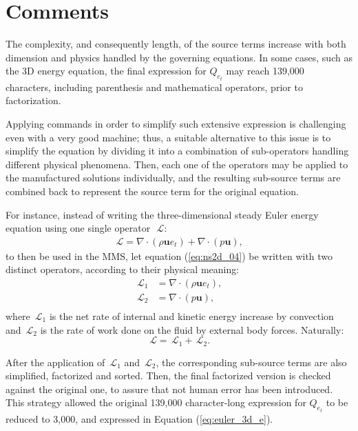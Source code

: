 \documentclass[10pt]{article}
\newcommand{\Diff}[2] {\dfrac{\partial( #1)}{\partial #2}}
\newcommand{\bv}[1]{\ensuremath{\mbox{\boldmath$ #1 $}}}
\newcommand{\Lo}{\,\mathcal{L}}
\begin{document}
\section{Comments}
The complexity, and consequently length, of the source terms increase with both dimension and physics handled by the governing equations. In some cases, such as the 3D energy equation, the final expression for $Q_{e_t}$ may reach 139,000 characters, including parenthesis and mathematical operators, prior to factorization.

Applying commands in order to simplify such extensive expression is challenging even with a very good machine; thus, a suitable alternative to this issue is to simplify the equation by dividing it into a combination of sub-operators handling different physical phenomena. Then, each one of the operators may be applied to the manufactured solutions individually, and the resulting sub-source terms are combined back to represent the source term for the original equation.


For instance, instead of writing the three-dimensional steady Euler energy equation using one single operator~$\Lo$:
\begin{equation}
 \label{eq:ns2d_04}
\begin{split}
\Lo= \nabla \cdot (\rho\mathbf{u}e_t)+ \nabla\cdot(p  \mathbf{u}) ,
\end{split}
\end{equation}
to then be used in the MMS, let equation (\ref{eq:ns2d_04}) be written with two distinct operators, according to their physical meaning:
\begin{equation*}
 \begin{split}
  \Lo_1&=\nabla \cdot (\rho\mathbf{u}e_t),\\
  \Lo_2&= \nabla\cdot(p  \mathbf{u}),\\
   \end{split}
\end{equation*}
where $\Lo_1$ is the net rate of internal and kinetic energy increase by convection and  $\Lo_2$ is the rate of work done on the fluid by external body forces. Naturally:
$$\Lo=\Lo_1+\Lo_2.$$


 After the application of $\Lo_1$ and $\Lo_2$, the corresponding sub-source terms are also simplified, factorized and sorted. Then, the final factorized version is checked against the original one, to assure that not human error has been introduced.  This strategy allowed the original  139,000 character-long  expression for $Q_{e_t}$ to be reduced to 3,000, and expressed in Equation (\ref{eq:euler_3d_e}).
\end{document}

